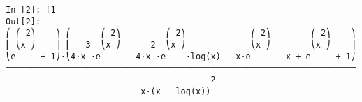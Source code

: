 ﻿\documentclass{article}
\begin{document}
\normalsize
\begin{Verbatim}
In [2]: f1
Out[2]: 
⎛ ⎛ 2⎞    ⎞ ⎛      ⎛ 2⎞         ⎛ 2⎞             ⎛ 2⎞        ⎛ 2⎞    ⎞
⎜ ⎝x ⎠    ⎟ ⎜   3  ⎝x ⎠      2  ⎝x ⎠             ⎝x ⎠        ⎝x ⎠    ⎟
⎝e     + 1⎠⋅⎝4⋅x ⋅e     - 4⋅x ⋅e    ⋅log(x) - x⋅e     - x + e     + 1⎠
──────────────────────────────────────────────────────────────────────
                                         2                            
                           x⋅(x - log(x))                             
\end{Verbatim}
\end{document}
